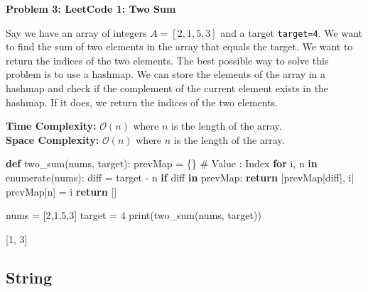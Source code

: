\documentclass[
  letterpaper,
  DIV=11,
  numbers=noendperiod]{scrartcl}
\newenvironment{Shaded}{\begin{snugshade}}{\end{snugshade}}
\newcommand{\BuiltInTok}[1]{\textcolor[rgb]{0.00,0.23,0.31}{#1}}
\newcommand{\CommentTok}[1]{\textcolor[rgb]{0.37,0.37,0.37}{#1}}
\newcommand{\ControlFlowTok}[1]{\textcolor[rgb]{0.00,0.23,0.31}{\textbf{#1}}}
\newcommand{\DecValTok}[1]{\textcolor[rgb]{0.68,0.00,0.00}{#1}}
\newcommand{\KeywordTok}[1]{\textcolor[rgb]{0.00,0.23,0.31}{\textbf{#1}}}
\newcommand{\NormalTok}[1]{\textcolor[rgb]{0.00,0.23,0.31}{#1}}
\newcommand{\OperatorTok}[1]{\textcolor[rgb]{0.37,0.37,0.37}{#1}}
\begin{document}
\begin{tcolorbox}[enhanced jigsaw, arc=.35mm, bottomrule=.15mm, breakable, colback=white, colframe=quarto-callout-note-color-frame, left=2mm, leftrule=.75mm, opacityback=0, rightrule=.15mm, toprule=.15mm]

\vspace{-3mm}\textbf{Problem 3: LeetCode 1: Two Sum}\vspace{3mm}

Say we have an array of integers \(A=[2,1,5,3]\) and a target
\texttt{target=4}. We want to find the sum of two elements in the array
that equals the target. We want to return the indices of the two
elements. The best possible way to solve this problem is to use a
hashmap. We can store the elements of the array in a hashmap and check
if the complement of the current element exists in the hashmap. If it
does, we return the indices of the two elements.

\textbf{Time Complexity:} \(\mathcal{O}(n)\) where \(n\) is the length
of the array.\\
\textbf{Space Complexity:} \(\mathcal{O}(n)\) where \(n\) is the length
of the array.

\begin{Shaded}
\begin{Highlighting}[]
\KeywordTok{def}\NormalTok{ two\_sum(nums, target):}
\NormalTok{  prevMap }\OperatorTok{=}\NormalTok{ \{\} }\CommentTok{\# Value : Index}
  \ControlFlowTok{for}\NormalTok{ i, n }\KeywordTok{in} \BuiltInTok{enumerate}\NormalTok{(nums):}
\NormalTok{    diff }\OperatorTok{=}\NormalTok{ target }\OperatorTok{{-}}\NormalTok{ n}
    \ControlFlowTok{if}\NormalTok{ diff }\KeywordTok{in}\NormalTok{ prevMap:}
      \ControlFlowTok{return}\NormalTok{ [prevMap[diff], i]}
\NormalTok{    prevMap[n] }\OperatorTok{=}\NormalTok{ i}
  \ControlFlowTok{return}\NormalTok{ []}

\NormalTok{nums }\OperatorTok{=}\NormalTok{ [}\DecValTok{2}\NormalTok{,}\DecValTok{1}\NormalTok{,}\DecValTok{5}\NormalTok{,}\DecValTok{3}\NormalTok{]}
\NormalTok{target }\OperatorTok{=} \DecValTok{4}
\BuiltInTok{print}\NormalTok{(two\_sum(nums, target))}
\end{Highlighting}
\end{Shaded}

{[}1, 3{]}

\end{tcolorbox}

\subsection{String}\label{string}
\end{document}
